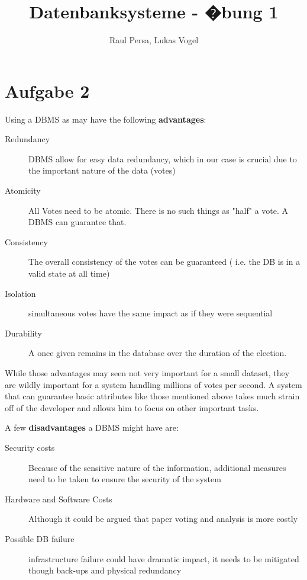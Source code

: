 \documentclass[10pt,a4paper]{article}
\author{Raul Persa, Lukas Vogel}
\title{Datenbanksysteme - �bung 1}
\begin{document}
\maketitle

\section*{Aufgabe 2}
Using a DBMS as may have the following \textbf{advantages}:
\begin{description}
	\item[Redundancy] DBMS allow for easy data redundancy, which in our case is crucial due to the important nature of the data (votes) 
	
	\item[Atomicity] All Votes need to be atomic. There is no such things as "half" a vote. A DBMS can guarantee that.
	
	\item[Consistency] The overall consistency of the votes can be guaranteed ( i.e. the DB is in a valid state at all time)
	
	\item[Isolation] simultaneous votes have the same impact as if they were sequential
	
	\item[Durability] A once given remains in the database over the duration of the election.
\end{description}
While those advantages may seen not very important for a small dataset, they are wildly important for a system handling millions of votes per second. A system that can guarantee basic attributes like those mentioned above takes much strain off of the developer and allows him to focus on other important tasks.

A few \textbf{disadvantages} a DBMS might have are:
\begin{description}
	\item[Security costs] Because of the sensitive nature of the information, additional measures need to be taken to ensure the security of the system
	\item[Hardware and Software Costs] Although it could be argued that paper voting and analysis is more costly
	\item[Possible DB failure]  infrastructure failure could have dramatic impact, it needs to be mitigated though back-ups and physical redundancy
\end{description}
\end{document}
